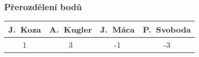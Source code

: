 \documentclass{beamer}
\begin{document}
\begin{frame}[allowframebreaks]\frametitle{Přerozdělení bodů}
    
    \begin{center}
  \begin{tabular}{| c | c | c | c |}
    \hline
     J.~Koza & A.~Kugler & J.~Máca & P.~Svoboda \\
    \hline
     1 & 3 & -1 & -3 \\
    \hline
  \end{tabular}     
   \end{center}
\end{frame}
\end{document}
